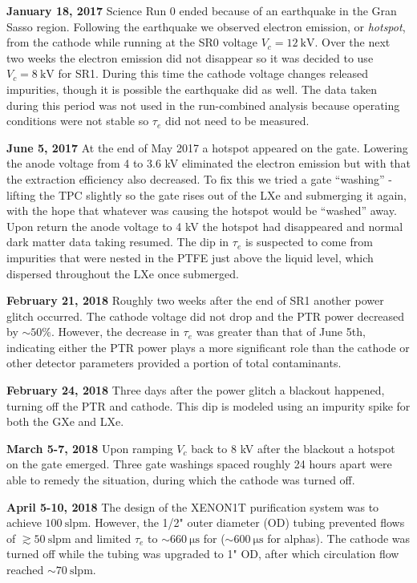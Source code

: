 \textbf{January 18, 2017} Science Run 0 ended because of an earthquake in the Gran Sasso region.  Following the earthquake we observed
electron emission, or \textit{hotspot}, from the cathode while running at the SR0 voltage $V_c = 12\ \mathrm{kV}$.  Over the next two
weeks the electron emission did
not disappear so it was decided to use $V_c = 8\ \mathrm{kV}$ for SR1.  During this time the cathode voltage changes released impurities,
though it is possible the earthquake did as well.  The data taken during this period was not used in the run-combined analysis because
operating conditions were not stable so $\tau_e$ did not need to be measured.

\textbf{June 5, 2017}  At the end of May 2017 a hotspot appeared on the gate.  Lowering the anode voltage from 4 to 3.6 kV eliminated the
electron emission but with that the extraction efficiency also decreased.  To fix this we tried a gate ``washing'' - lifting the TPC
slightly so the gate rises out of the LXe and submerging it again, with the hope that whatever was causing the hotspot would be ``washed''
away.  Upon return the anode voltage to 4 kV the hotspot had disappeared and normal dark matter data taking resumed.  The dip in $\tau_e$
is suspected to come from impurities that were nested in the PTFE just above the liquid level, which dispersed throughout the LXe once
submerged.

\textbf{February 21, 2018}  Roughly two weeks after the end of SR1 another power glitch occurred.  The cathode voltage did not drop and
the PTR power decreased by ${\sim} 50\%$.  However, the decrease in $\tau_e$ was greater than that of June 5th, indicating either the PTR
power plays a more significant role than the cathode or other detector parameters provided a portion of total contaminants.

\textbf{February 24, 2018}  Three days after the power glitch a blackout happened, turning off the PTR and cathode.  This dip is modeled
using an impurity spike for both the GXe and LXe.

\textbf{March 5-7, 2018}  Upon ramping $V_c$ back to 8 kV after the blackout a hotspot on the gate emerged.  Three gate washings spaced
roughly 24 hours apart were able to remedy the situation, during which the cathode was turned off.

\textbf{April 5-10, 2018}  The design of the XENON1T purification system was to achieve $100\ \mathrm{slpm}$.  However, the
1/2" outer diameter (OD) tubing prevented flows of $\gtrsim 50\ \mathrm{slpm}$ and limited $\tau_e$ to ${\sim} 660\ \mathrm{\mu s}$ for
\metakr (${\sim} 600\ \mathrm{\mu s}$ for alphas).  The cathode was turned off while the tubing was upgraded to 1" OD, after which
circulation flow reached ${\sim} 70\ \mathrm{slpm}$.

